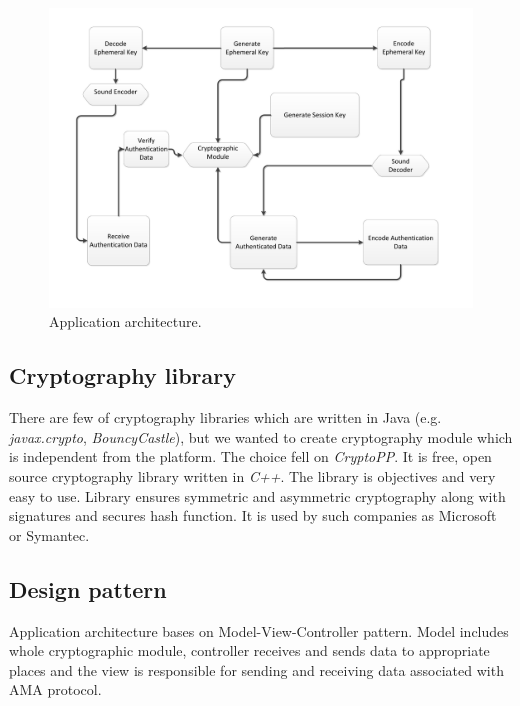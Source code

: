 \documentclass[11pt,titlepage]{article}
\theoremstyle{plain}
\begin{document}
\vspace{5mm}

\begin{figure}[H]
	\centering
	\includegraphics[width=1\textwidth]{img/Architecture_pdf.pdf}
	\caption{Application architecture.}
\end{figure}

\subsection{Cryptography library}

There are few of cryptography libraries which are written in Java (e.g. \textit{javax.crypto}, \textit{BouncyCastle}), but we wanted to create cryptography module which is independent from the platform. The choice fell on \textit{CryptoPP}. It is free, open source cryptography library written in \textit{C++}. The library is objectives and very easy to use. Library ensures symmetric and asymmetric cryptography along with signatures and secures hash function. It is used by such companies as Microsoft or Symantec.

\subsection{Design pattern}

Application architecture bases on Model-View-Controller pattern. Model includes whole cryptographic module, controller receives and sends data to appropriate places and the view is responsible for sending and receiving data associated with AMA protocol. 
\end{document}
